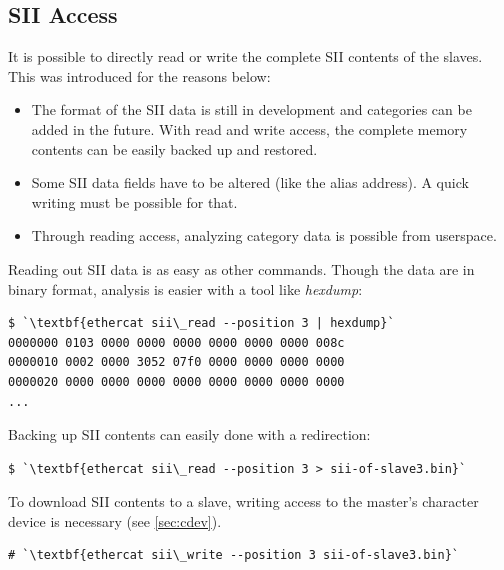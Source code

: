 \documentclass[a4paper,12pt,BCOR6mm,bibtotoc,idxtotoc]{scrbook}
\begin{document}
\subsection{SII Access}
\label{sec:siiaccess}

It is possible to directly read or write the complete SII contents of the
slaves. This was introduced for the reasons below:

\begin{itemize}

\item The format of the SII data is still in development and categories can be
added in the future. With read and write access, the complete memory contents
can be easily backed up and restored.

\item Some SII data fields have to be altered (like the alias address). A quick
writing must be possible for that.

\item Through reading access, analyzing category data is possible from
userspace.

\end{itemize}



Reading out SII data is as easy as other commands. Though the data are in
binary format, analysis is easier with a tool like \textit{hexdump}:

\begin{lstlisting}
$ `\textbf{ethercat sii\_read --position 3 | hexdump}`
0000000 0103 0000 0000 0000 0000 0000 0000 008c
0000010 0002 0000 3052 07f0 0000 0000 0000 0000
0000020 0000 0000 0000 0000 0000 0000 0000 0000
...
\end{lstlisting}

Backing up SII contents can easily done with a redirection:

\begin{lstlisting}
$ `\textbf{ethercat sii\_read --position 3 > sii-of-slave3.bin}`
\end{lstlisting}

To download SII contents to a slave, writing access to the master's character
device is necessary (see \autoref{sec:cdev}).



\begin{lstlisting}
# `\textbf{ethercat sii\_write --position 3 sii-of-slave3.bin}`
\end{lstlisting}
\end{document}
